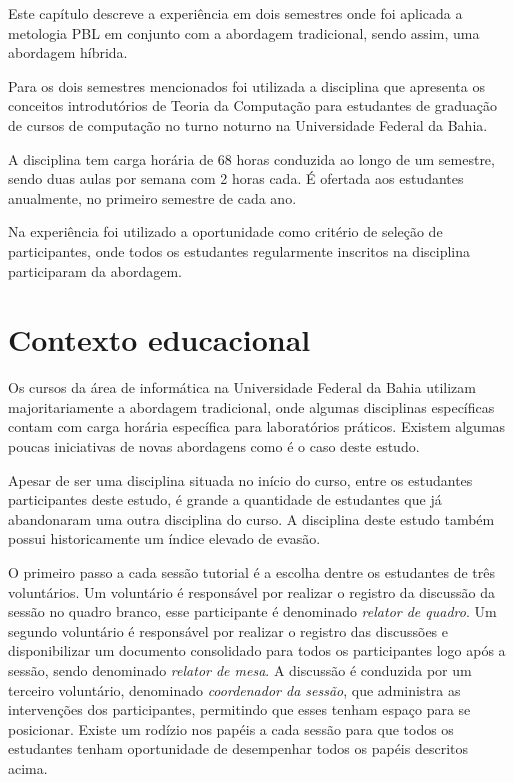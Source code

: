 \label{cap-experiencia}
\acresetall

Este capítulo descreve a experiência em dois semestres onde foi aplicada a metologia PBL
em conjunto com a abordagem tradicional, sendo assim, uma abordagem híbrida.

Para os dois semestres mencionados foi utilizada a disciplina que apresenta os
conceitos introdutórios de Teoria da Computação para estudantes de graduação de cursos de computação
no turno noturno na Universidade Federal da Bahia.

A disciplina tem carga horária de 68 horas conduzida ao longo de um semestre, sendo duas
aulas por semana com 2 horas cada.
É ofertada aos estudantes anualmente, no primeiro semestre de cada ano.

Na experiência foi utilizado a oportunidade como critério de seleção de participantes, onde todos os
estudantes regularmente inscritos na disciplina participaram da abordagem.

\section{Contexto educacional}
Os cursos da área de informática na Universidade Federal da Bahia
utilizam majoritariamente a abordagem tradicional, onde
algumas disciplinas específicas contam com carga horária específica
para laboratórios práticos.
Existem algumas poucas iniciativas de novas abordagens como é
o caso deste estudo.

Apesar de ser uma disciplina situada no início do
curso, entre os estudantes participantes deste estudo,
é grande a quantidade de estudantes que já abandonaram uma
outra disciplina do curso.
A disciplina deste estudo também possui historicamente um índice
elevado de evasão.



O primeiro passo a cada sessão tutorial é a escolha dentre os
estudantes de três voluntários.
Um voluntário é responsável por realizar o registro da discussão
da sessão no quadro branco, esse
participante é denominado \textit{relator de quadro}.
Um segundo voluntário é responsável por realizar o registro
das discussões e disponibilizar um documento consolidado para todos
os participantes logo após
a sessão, sendo denominado \textit{relator de mesa}.
A discussão é conduzida por um terceiro voluntário,
denominado \textit{coordenador da sessão}, que administra
as intervenções dos participantes, permitindo que esses
tenham espaço para se posicionar.
Existe um rodízio nos papéis a cada sessão para que todos
os estudantes tenham oportunidade de desempenhar todos
os papéis descritos acima.

